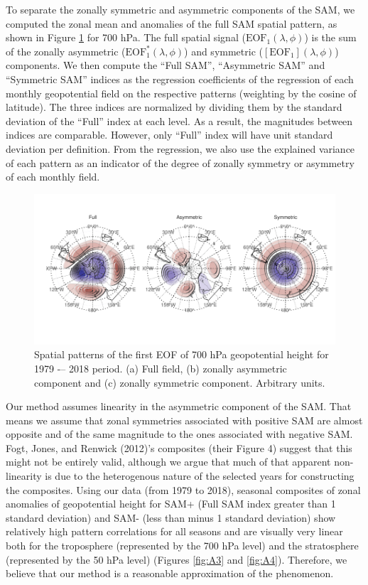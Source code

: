 \documentclass[smallextended]{svjour3}       %
\begin{document}
To separate the zonally symmetric and asymmetric components of the SAM, we computed the zonal mean and anomalies of the full SAM spatial pattern, as shown in Figure \ref{fig:method} for 700 hPa. The full spatial signal (\(\mathrm{EOF_1}(\lambda, \phi)\)) is the sum of the zonally asymmetric (\(\mathrm{EOF_1^*}(\lambda, \phi)\)) and symmetric (\([\mathrm{EOF_1}](\lambda, \phi)\)) components. We then compute the ``Full SAM'', ``Asymmetric SAM'' and ``Symmetric SAM'' indices as the regression coefficients of the regression of each monthly geopotential field on the respective patterns (weighting by the cosine of latitude). The three indices are normalized by dividing them by the standard deviation of the ``Full'' index at each level. As a result, the magnitudes between indices are comparable. However, only ``Full'' index will have unit standard deviation per definition. From the regression, we also use the explained variance of each pattern as an indicator of the degree of zonally symmetry or asymmetry of each monthly field.

\begin{figure}
\includegraphics{figures/method-1} \caption{Spatial patterns of the first EOF of 700 hPa geopotential height for 1979 -– 2018 period. (a) Full field, (b) zonally asymmetric component and (c) zonally symmetric component. Arbitrary units.}\label{fig:method}
\end{figure}

Our method assumes linearity in the asymmetric component of the SAM. That means we assume that zonal symmetries associated with positive SAM are almost opposite and of the same magnitude to the ones associated with negative SAM. Fogt, Jones, and Renwick (2012)'s composites (their Figure 4) suggest that this might not be entirely valid, although we argue that much of that apparent non-linearity is due to the heterogenous nature of the selected years for constructing the composites. Using our data (from 1979 to 2018), seasonal composites of zonal anomalies of geopotential height for SAM+ (Full SAM index greater than 1 standard deviation) and SAM- (less than minus 1 standard deviation) show relatively high pattern correlations for all seasons and are visually very linear both for the troposphere (represented by the 700 hPa level) and the stratosphere (represented by the 50 hPa level) (Figures \ref{fig:A3} and \ref{fig:A4}). Therefore, we believe that our method is a reasonable approximation of the phenomenon.
\end{document}
